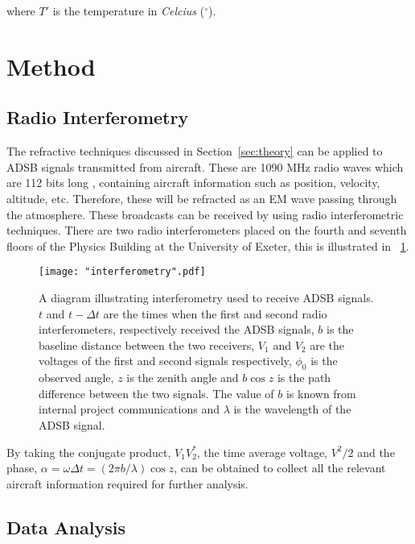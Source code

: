 \documentclass{article}
\newcommand{\figref}[2][\figurename~]{#1\ref{#2}}
\newcommand{\secref}[2][Section~]{#1\ref{#2}}
\begin{document}
\vspace{2mm}
\noindent
where $T'$ is the temperature in \textit{Celcius} ($^{\circ}$).

\section{Method}
\label{sec:method}

\subsection{Radio Interferometry}
\label{ssec:radio-interferometry}

The refractive techniques discussed in \secref{sec:theory} can be applied to ADSB signals transmitted from aircraft. These are 1090 MHz radio waves which are 112 bits long \cite{Book02}, containing aircraft information such as position, velocity, altitude, etc. Therefore, these will be refracted as an EM wave passing through the atmosphere. These broadcasts can be received by using radio interferometric techniques. There are two radio interferometers placed on the fourth and seventh floors of the Physics Building at the University of Exeter, this is illustrated in \figref{fig:interferometry}.

\begin{figure}[h]
\centering
\texttt{[image: "interferometry".pdf]}
\caption{A diagram illustrating interferometry used to receive ADSB signals. $t$ and $t - \Delta t$ are the times when the first and second radio interferometers, respectively received the ADSB signals, $b$ is the baseline distance between the two receivers, $V_1$ and $V_2$ are the voltages of the first and second signals respectively, $\phi_0$ is the observed angle, $z$ is the zenith angle and $b \cos z$ is the path difference between the two signals. The value of $b$ is known from internal project communications and $\lambda$ is the wavelength of the ADSB signal.}
\label{fig:interferometry}
\end{figure}

\vspace{2mm}
\noindent
By taking the conjugate product, $V_1 V_2^*$, the time average voltage, $V^2/2$ and the phase, $\alpha = \omega \Delta t = (2 \pi b / \lambda) \cos z$, can be obtained to collect all the relevant aircraft information required for further analysis.


\subsection{Data Analysis}
\label{ssec:data-analysis}
\end{document}
